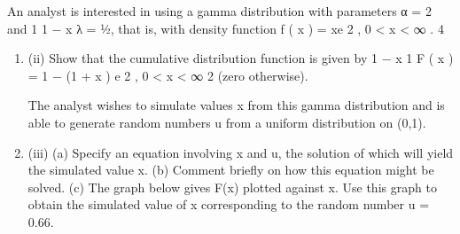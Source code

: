 \documentclass[a4paper,12pt]{article}
\begin{document}
An analyst is interested in using a gamma distribution with parameters α = 2 and
1
1 − x
λ = 1⁄2, that is, with density function f ( x ) = xe 2 , 0 < x < ∞ .
4
\begin{enumerate}
\tiem (i)
(a) State the mean and standard deviation of this distribution.
(b) Hence comment briefly on its shape.

\item (ii)
Show that the cumulative distribution function is given by
1
− x
1
F ( x ) = 1 − (1 + x ) e 2 , 0 < x < ∞
2
(zero otherwise).

The analyst wishes to simulate values x from this gamma distribution and is able to
generate random numbers u from a uniform distribution on (0,1).
\item (iii)
(a) Specify an equation involving x and u, the solution of which will yield
the simulated value x.
(b) Comment briefly on how this equation might be solved.
(c) The graph below gives F(x) plotted against x. Use this graph to obtain
the simulated value of x corresponding to the random number u = 0.66.
\end{enumerate}
\end{document}
